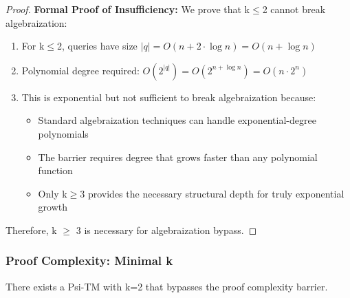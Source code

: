 \documentclass[11pt]{article}
\begin{document}
\begin{proof}
\textbf{Formal Proof of Insufficiency:}
We prove that k$\leq$2 cannot break algebraization:
\begin{enumerate}
\item For k$\leq$2, queries have size $|q| = O(n + 2 \cdot \log n) = O(n + \log n)$
\item Polynomial degree required: $O(2^{|q|}) = O(2^{n + \log n}) = O(n \cdot 2^n)$
\item This is exponential but not sufficient to break algebraization because:
  \begin{itemize}
  \item Standard algebraization techniques can handle exponential-degree polynomials
  \item The barrier requires degree that grows faster than any polynomial function
  \item Only k$\geq$3 provides the necessary structural depth for truly exponential growth
  \end{itemize}
\end{enumerate}

Therefore, k $\geq$ 3 is necessary for algebraization bypass.
\end{proof}

\subsubsection{Proof Complexity: Minimal k}

\begin{theorem}[Proof Complexity Bypass with k=2]
\label{thm:proof-complexity-k2}
There exists a Psi-TM with k=2 that bypasses the proof complexity barrier.
\end{theorem}
\end{document}
